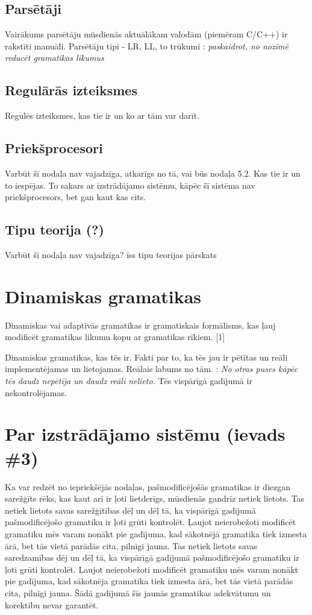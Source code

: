 \documentclass[12pt]{report}
\newcommand{\fixme}[1]{\vskip 5mm\noindent{\bf FIXME}: {\it #1}}
\begin{document}
\subsection{Parsētāji}
Vairākums parsētāju mūsdienās aktuālākam valodām (piemēram C/C++) ir rakstīti manuāli. 
Parsētāju tipi - LR, LL, to trūkumi
\fixme{paskaidrot, no nozīmē reducēt gramatikas likumus}


\subsection{Regulārās izteiksmes}
Regulēs izteiksmes, kas tie ir un ko ar tām var darīt.

\subsection{Priekšprocesori}
Varbūt šī nodaļa nav vajadzīga, atkarīgs no tā, vai būs nodaļa 5.2.
Kas tie ir un to iespējas.
To sakars ar izstrādājamo sistēmu, kāpēc šī sistēma nav priekšprocesors, bet gan kaut kas cits.

\subsection{Tipu teorija (?)}
Varbūt šī nodaļa nav vajadzīga?
īss tipu teorijas pārskats

\section{Dinamiskas gramatikas}
Dinamiskas vai adaptīvās gramatikas ir gramatiskais formālisms, kas ļauj modificēt gramatikas likumu kopu ar gramatikas rīkiem. [1]



Dinamiskas gramatikas, kas tēs ir. Fakti par to, ka tēs jau ir pētītas un reāli implementējamas un lietojamas. Reālais labums no tām.
\fixme{No otras puses kāpēc tēs daudz nepētīja un daudz reāli nelieto.} Tēs vispārīgā gadījumā ir nekontrolējamas.



\section{Par izstrādājamo sistēmu (ievads \#3)}
Ka var redzēt no iepriekšējās nodaļas, pašmodificējošās gramatikas ir diezgan sarežģīts rēks, kas kaut arī ir ļoti lietderīgs, mūsdienās gandrīz netiek lietots. Tas netiek lietots savas sarežģītības dēļ un dēļ tā, ka vispārīgā gadījumā pašmodificējošo gramatiku ir ļoti grūti kontrolēt. Ļaujot neierobežoti modificēt gramatiku mēs varam nonākt pie gadījuma, kad sākotnējā gramatika tiek izmesta ārā, bet tās vietā parādās cita, pilnīgi jauna. Tas netiek lietots savas saredzamības dēj un dēļ tā, ka vispārīgā gadījumā pašmodificējošo gramatiku ir ļoti grūti kontrolēt. Ļaujot neierobežoti modificēt gramatiku mēs varam nonākt pie gadījuma, kad sākotnēja gramatika tiek izmesta ārā, bet tās vietā parādās cita, pilnīgi jauna. Šādā gadījumā šīs jaunās gramatikas adekvātumu un korektību nevar garantēt.
\end{document}

